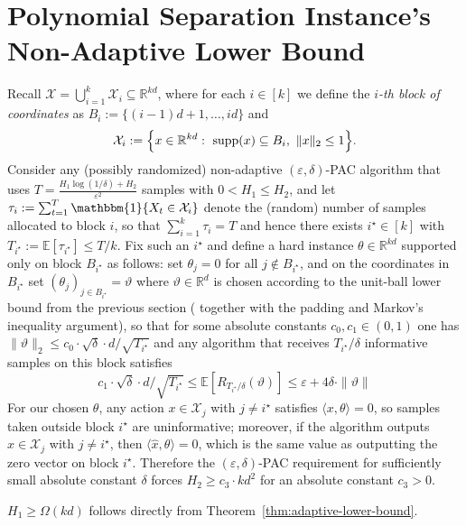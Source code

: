 \section{Polynomial Separation Instance's Non-Adaptive Lower Bound}\label{appendix-poly-sep-lower-bound}
Recall $\mathcal{X}=\bigcup_{i=1}^k \mathcal{X}_i\subseteq \mathbb{R}^{kd}$, where for each $i\in[k]$ we define the \emph{$i$-th block of coordinates} as $B_i:=\{(i-1)d+1,\ldots,id\}$ and
\[
\mathcal{X}_i:=\Bigl\{x\in\mathbb{R}^{kd}:\ \mathrm{supp}(x)\subseteq B_i,\ \|x\|_2\le 1\Bigr\}.
\]
Consider any (possibly randomized) non-adaptive $(\varepsilon,\delta)$-PAC algorithm that uses $T=\frac{H_1\log(1/\delta)+H_2}{\varepsilon^2}$ samples with $0<H_1\le H_2$, and let $\tau_i:=\sum_{t=1}^T \mathbbm{1}\{X_t\in\mathcal{X}_i\}$ denote the (random) number of samples allocated to block $i$, so that $\sum_{i=1}^k \tau_i=T$ and hence there exists $i^\star\in[k]$ with $T_{i^\star}:=\mathbb{E}[\tau_{i^\star}]\le T/k$. Fix such an $i^\star$ and define a hard instance $\theta\in\mathbb{R}^{kd}$ supported only on block $B_{i^\star}$ as follows: set $\theta_j=0$ for all $j\notin B_{i^\star}$, and on the coordinates in $B_{i^\star}$ set $(\theta_j)_{j\in B_{i^\star}}=\vartheta$ where $\vartheta\in\mathbb{R}^d$ is chosen according to the unit-ball lower bound from the previous section (\cite{chen2024assouad} together with the padding and Markov's inequality argument), so that for some absolute constants $c_0,c_1\in(0,1)$ one has $\|\vartheta\|_2\le c_0\cdot \sqrt{\delta}\cdot d/\sqrt{T_{i^\star}}$ and any algorithm that receives $T_{i^\star}/\delta$ informative samples on this block satisfies 
\[
c_1\cdot \sqrt{\delta}\cdot d/\sqrt{T_{i^\star}} \le\mathbb{E}[R_{T_{i^\star}/\delta}(\vartheta)]\le \varepsilon +4\delta\cdot\|\vartheta\| 
\]
For our chosen $\theta$, any action $x\in\mathcal{X}_j$ with $j\neq i^\star$ satisfies $\langle x,\theta\rangle=0$, so samples taken outside block $i^\star$ are uninformative; moreover, if the algorithm outputs $\hat x\in\mathcal{X}_j$ with $j\neq i^\star$, then $\langle \hat x,\theta\rangle=0$, which is the same value as outputting the zero vector on block $i^\star$. Therefore the $(\varepsilon,\delta)$-PAC requirement for sufficiently small absolute constant $\delta$ forces $H_2\ge c_3\cdot kd^2$ for an absolute constant $c_3>0$.

$H_1\geq \Omega(kd)$ follows directly from Theorem~\ref{thm:adaptive-lower-bound}.

